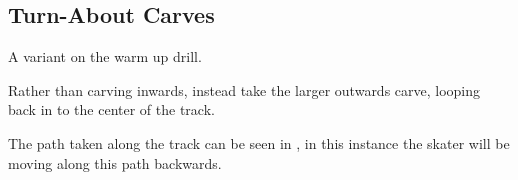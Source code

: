 \subsection*{Turn-About Carves}

A variant on the warm up drill.

Rather than carving inwards, instead take the larger outwards carve, looping back in to the center of the track. 

The path taken along the track can be seen in , in this instance the skater will be moving along this path backwards. 
